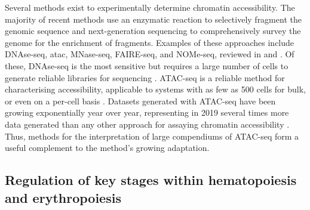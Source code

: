 

Several methods exist to experimentally determine chromatin accessibility. The majority of recent methods use an enzymatic reaction to selectively fragment the genomic sequence and next-generation sequencing to comprehensively survey the genome for the enrichment of fragments. Examples of these approaches include DNAse-seq, \gls{atac}, MNase-seq, FAIRE-seq, and NOMe-seq, reviewed in \textcite{Klemm} and \textcite{Meyer2014}. Of these, DNAse-seq is the most sensitive but requires a large number of cells to generate reliable libraries for sequencing \cite{Boyle2008}. ATAC-seq is a reliable method for characterising accessibility, applicable to systems with as few as 500 cells for bulk, or even on a per-cell basis \cite{Corces2017,Buenrostro2015}. Datasets generated with ATAC-seq have been growing exponentially year over year, representing in 2019 several times more data generated than any other approach for assaying chromatin accessibility \cite{Yan2020}. Thus, methods for the interpretation of large compendiums of ATAC-seq form a useful complement to the method's growing adaptation. 

\subsection{Regulation of key stages within hematopoiesis and erythropoiesis} \label{ch4:ery}

